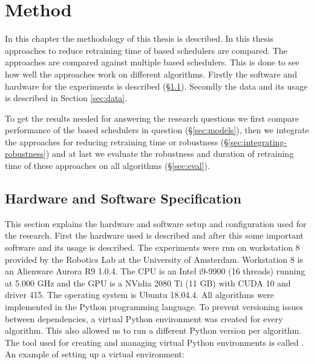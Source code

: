 \chapter{Method}


In this chapter the methodology of this thesis is described. In this thesis
approaches to reduce retraining time of \rl based schedulers are compared. The
approaches are compared against multiple \rl based schedulers. This is done to
see how well the approaches work on different \rl algorithms. Firstly the
software and hardware for the experiments is described (§\ref{sec:setup}).
Secondly the data and its usage is described in Section \ref{sec:data}.


To get the results needed for answering the research questions we first
compare performance of the \rl based schedulers in question
(§\ref{sec:models}), then we integrate the approaches for reducing retraining
time or robustness (§\ref{sec:integrating-robustness}) and at last we evaluate
the robustness and duration of retraining time of these approaches on all \rl
algorithms (§\ref{sec:eval}).


\section{Hardware and Software Specification}\label{sec:setup}

This section explains the hardware and software setup and configuration used
for the research. First the hardware used is described and after this some
important software and its usage is described. The experiments were run on
workstation 8 provided by the Robotics Lab at the University of Amsterdam.
Workstation 8 is an Alienware Aurora R9 1.0.4. The CPU is an Intel i9-9900 (16
threads) running at 5.000 GHz and the GPU is a NVidia 2080 Ti (11 GB) with
CUDA 10 and driver 415. The operating system is Ubuntu 18.04.4. All algorithms
were implemented in the Python programming language. To
prevent versioning issues between dependencies, a virtual Python environment
was created for every algorithm. This also allowed us to run a different
Python version per algorithm. The tool used for creating and managing virtual
Python environments is called .
An example of setting up a virtual environment:

